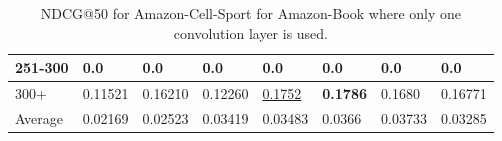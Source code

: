 \begin{table*}[]
\begin{tabular}{|l|l|l|l|l|l|l||l|}
        251-300 & 0.0                            & 0.0                            & 0.0                            & 0.0                            & 0.0                            & 0.0                             & 0.0                        \\ \hline
        300+    & 0.11521                        & 0.16210                        & 0.12260                        & \underline{0.1752}             & \textbf{0.1786}                & 0.1680                          & 0.16771                    \\ \hline
        Average & 0.02169                        & 0.02523                        & 0.03419                        & 0.03483                        & 0.0366                         & 0.03733                         & 0.03285                    \\ \hline
    \end{tabular}
    \caption{NDCG@50 for Amazon-Cell-Sport for Amazon-Book where only one convolution layer is used.}
    \label{tab:Amazon-Cell-Sport-ndcg-evaluation}
\end{table*}

